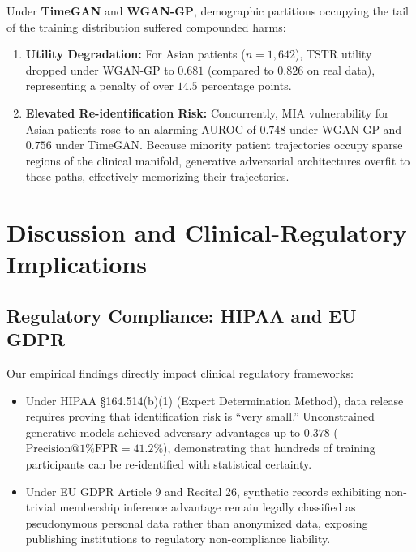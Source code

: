 \documentclass[journal]{IEEEtran}
\begin{document}
Under \textbf{TimeGAN} and \textbf{WGAN-GP}, demographic partitions occupying the tail of the training distribution suffered compounded harms:
\begin{enumerate}
    \item \textbf{Utility Degradation:} For Asian patients ($n = 1,642$), TSTR utility dropped under WGAN-GP to $0.681$ (compared to $0.826$ on real data), representing a penalty of over $14.5$ percentage points.
    \item \textbf{Elevated Re-identification Risk:} Concurrently, MIA vulnerability for Asian patients rose to an alarming AUROC of $0.748$ under WGAN-GP and $0.756$ under TimeGAN. Because minority patient trajectories occupy sparse regions of the clinical manifold, generative adversarial architectures overfit to these paths, effectively memorizing their trajectories.
\end{enumerate}

\section{Discussion and Clinical-Regulatory Implications}

\subsection{Regulatory Compliance: HIPAA and EU GDPR}
Our empirical findings directly impact clinical regulatory frameworks:
\begin{itemize}
    \item Under HIPAA \S164.514(b)(1) (Expert Determination Method), data release requires proving that identification risk is ``very small.'' Unconstrained generative models achieved adversary advantages up to $0.378$ ($\text{Precision@1\%FPR} = 41.2\%$), demonstrating that hundreds of training participants can be re-identified with statistical certainty.
    \item Under EU GDPR Article 9 and Recital 26, synthetic records exhibiting non-trivial membership inference advantage remain legally classified as pseudonymous personal data rather than anonymized data, exposing publishing institutions to regulatory non-compliance liability.
\end{itemize}
\end{document}
